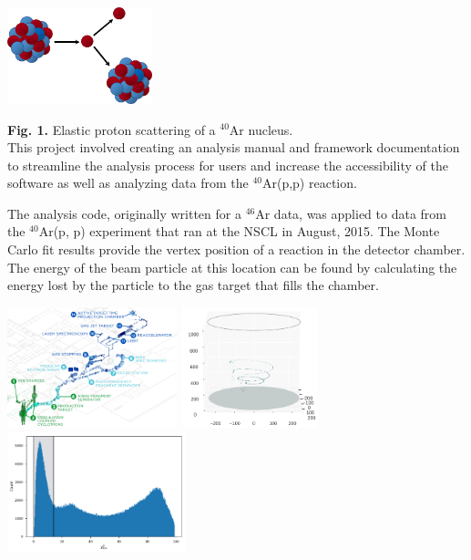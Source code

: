 \documentclass[ansiepaperDNP,portrait]{baposterDNP}
\begin{document}
\begin{poster}
{{\begin{center}
\includegraphics [width=42mm]{ar40_p.png}
\end{center}
\vspace{-.8em}

\small{\textbf{Fig. 1.} Elastic proton scattering of a $^{40}$Ar nucleus.} \\


This project involved creating an analysis manual and framework documentation to streamline the analysis process for users and increase the accessibility of the software as well as analyzing data from the $^{40}$Ar(p,p) reaction.}

}
{\small{The analysis code, originally written for a $^{46}$Ar data, was applied to data from the $^{40}$Ar(p, p) experiment that ran at the NSCL in August,  2015.}
\small{The Monte Carlo fit results provide the vertex position of a reaction in the detector chamber. The energy of the beam particle at this location can be found by calculating the energy lost by the particle to the gas target that fills the chamber.}

\begin{center}
\includegraphics [height=35mm]{NSCL_schematic.png}
\hspace{.5cm}
\includegraphics [height=35mm] {chamber_plot.png}
\hspace{.5cm}
\includegraphics [height=35mm] {chi2pos.pdf}
\end{center}
\vspace{-1em}

}
\end{poster}
\end{document}
